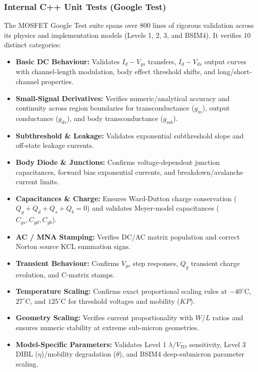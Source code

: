 \subsubsection{Internal C++ Unit Tests (Google Test)}
The MOSFET Google Test suite spans over 800 lines of rigorous validation across its physics and implementation models (Levels 1, 2, 3, and BSIM4). It verifies 10 distinct categories:
\begin{itemize}
    \item \textbf{Basic DC Behaviour:} Validates $I_d-V_{gs}$ transfers, $I_d-V_{ds}$ output curves with channel-length modulation, body effect threshold shifts, and long/short-channel properties.
    \item \textbf{Small-Signal Derivatives:} Verifies numeric/analytical accuracy and continuity across region boundaries for transconductance ($g_m$), output conductance ($g_{ds}$), and body transconductance ($g_{mb}$).
    \item \textbf{Subthreshold \& Leakage:} Validates exponential subthreshold slope and off-state leakage currents.
    \item \textbf{Body Diode \& Junctions:} Confirms voltage-dependent junction capacitances, forward bias exponential currents, and breakdown/avalanche current limits.
    \item \textbf{Capacitances \& Charge:} Ensures Ward-Dutton charge conservation ($Q_g+Q_d+Q_s+Q_b=0$) and validates Meyer-model capacitances ($C_{gs}, C_{gd}, C_{gb}$).
    \item \textbf{AC / MNA Stamping:} Verifies DC/AC matrix population and correct Norton source KCL summation signs.
    \item \textbf{Transient Behaviour:} Confirms $V_{gs}$ step responses, $Q_g$ transient charge evolution, and C-matrix stamps.
    \item \textbf{Temperature Scaling:} Confirms exact proportional scaling rules at $-40^\circ\text{C}$, $27^\circ\text{C}$, and $125^\circ\text{C}$ for threshold voltages and mobility ($KP$).
    \item \textbf{Geometry Scaling:} Verifies current proportionality with $W/L$ ratios and ensures numeric stability at extreme sub-micron geometries.
    \item \textbf{Model-Specific Parameters:} Validates Level 1 $\lambda$/$V_{TO}$ sensitivity, Level 3 DIBL ($\eta$)/mobility degradation ($\theta$), and BSIM4 deep-submicron parameter scaling.
\end{itemize}

